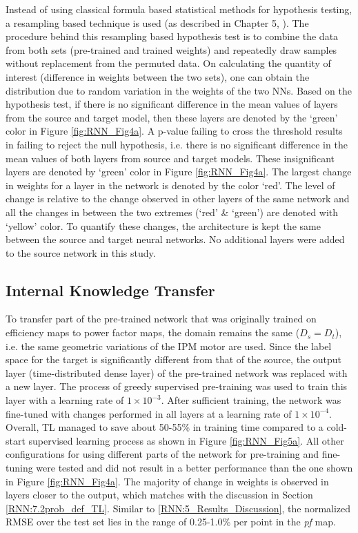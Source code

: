 Instead of using classical formula based statistical methods for hypothesis testing, a resampling based technique is used (as described in Chapter 5, \cite{bruce2020practical}). The procedure behind this resampling based hypothesis test is to combine the data from both sets (pre-trained and trained weights) and repeatedly draw samples without replacement from the permuted data. On calculating the quantity of interest (difference in weights between the two sets), one can obtain the distribution due to random variation in the weights of the two NNs. Based on the hypothesis test, if there is no significant difference in the mean values of layers from the source and target model, then these layers are denoted by the ‘green’ color in Figure \ref{fig:RNN_Fig4a}. A p-value failing to cross the threshold results in failing to reject the null hypothesis, i.e. there is no significant difference in the mean values of both layers from source and target models. These insignificant layers are denoted by ‘green’ color in Figure \ref{fig:RNN_Fig4a}. The largest change in weights for a layer in the network is denoted by the color ‘red’. The level of change is relative to the change observed in other layers of the same network and all the changes in between the two extremes (‘red’ & ‘green’) are denoted with ‘yellow’ color. To quantify these changes, the architecture is kept the same between the source and target neural networks. No additional layers were added to the source network in this study.

\subsection{Internal Knowledge Transfer}\label{RNN:9_Results_TL_Internal}

To transfer part of the pre-trained network that was originally trained on efficiency maps to power factor maps, the domain remains the same ($D_s=D_t$), i.e. the same geometric variations of the IPM motor are used. Since the label space for the target is significantly different from that of the source, the output layer (time-distributed dense layer) of the pre-trained network was replaced with a new layer. The process of greedy supervised pre-training was used to train this layer with a learning rate of $1 \times 10^{-3}$. After sufficient training, the network was fine-tuned with changes performed in all layers at a learning rate of $1 \times 10^{-4}$. Overall, TL managed to save about 50-55\% in training time compared to a cold-start supervised learning process as shown in Figure \ref{fig:RNN_Fig5a}. All other configurations for using different parts of the network for pre-training and fine-tuning were tested and did not result in a better performance than the one shown in Figure  \ref{fig:RNN_Fig4a}. The majority of change in weights is observed in layers closer to the output, which matches with the discussion in Section \ref{RNN:7.2prob_def_TL}. Similar to \ref{RNN:5_Results_Discussion}, the normalized RMSE over the test set lies in the range of 0.25-1.0\% per point in the \textit{pf} map.

